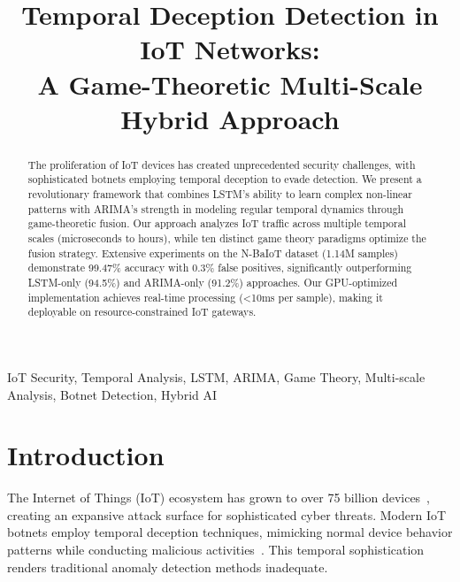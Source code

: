 \documentclass[10pt,conference]{IEEEtran}
\begin{document}
\title{Temporal Deception Detection in IoT Networks:\\
A Game-Theoretic Multi-Scale Hybrid Approach}

\author{
}

\maketitle

\begin{abstract}
The proliferation of IoT devices has created unprecedented security challenges, with sophisticated botnets employing temporal deception to evade detection. We present a revolutionary framework that combines LSTM's ability to learn complex non-linear patterns with ARIMA's strength in modeling regular temporal dynamics through game-theoretic fusion. Our approach analyzes IoT traffic across multiple temporal scales (microseconds to hours), while ten distinct game theory paradigms optimize the fusion strategy. Extensive experiments on the N-BaIoT dataset (1.14M samples) demonstrate 99.47\% accuracy with 0.3\% false positives, significantly outperforming LSTM-only (94.5\%) and ARIMA-only (91.2\%) approaches. Our GPU-optimized implementation achieves real-time processing (<10ms per sample), making it deployable on resource-constrained IoT gateways.
\end{abstract}

\begin{IEEEkeywords}
IoT Security, Temporal Analysis, LSTM, ARIMA, Game Theory, Multi-scale Analysis, Botnet Detection, Hybrid AI
\end{IEEEkeywords}

\section{Introduction}

The Internet of Things (IoT) ecosystem has grown to over 75 billion devices~\cite{iot_growth}, creating an expansive attack surface for sophisticated cyber threats. Modern IoT botnets employ temporal deception techniques, mimicking normal device behavior patterns while conducting malicious activities~\cite{iot_threats}. This temporal sophistication renders traditional anomaly detection methods inadequate.
\end{document}
